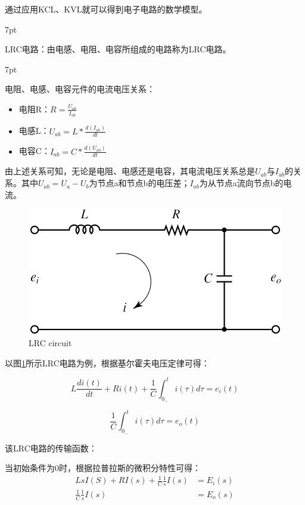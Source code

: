 \documentclass{article}
\numberwithin{equation}{section}
\numberwithin{figure}{section}
\newenvironment{formal}{%
\def\FrameCommand{%
\hspace{1pt}%
{\color{DarkBlue}\vrule width 2pt}%
{\color{formalshade}\vrule width 4pt}%
\colorbox{formalshade}%
}%
\MakeFramed{\advance\hsize-\width\FrameRestore}%
\noindent\hspace{-4.55pt}%
\begin{adjustwidth}{}{7pt}%
\vspace{2pt}\vspace{2pt}%
}
{%
\vspace{2pt}\end{adjustwidth}\endMakeFramed%
}
\begin{document}
通过应用KCL、KVL就可以得到电子电路的数学模型。

\begin{formal}
    LRC电路：由电感、电阻、电容所组成的电路称为LRC电路。
\end{formal}

\begin{formal}
    电阻、电感、电容元件的电流电压关系：
    \begin{itemize}
        \item 电阻R：$R=\frac{U_{ab}}{I_{ab}}$
        \item 电感L：$U_{ab}=L*\frac{d(I_{ab})}{dt}$
        \item 电容C：$I_{ab}=C*\frac{d(U_{ab})}{dt}$
    \end{itemize}
    由上述关系可知，无论是电阻、电感还是电容，其电流电压关系总是$U_{ab}$与$I_{ab}$的关系。其中$U_{ab}=U_{a}-U_{b}$为节点a和节点b的电压差；$I_{ab}$为从节点a流向节点b的电流。
\end{formal}

\begin{figure}
    \centering
    \includegraphics[width=.4\textwidth]{Chapter3/LRCcircuit.png} %
    \caption{LRC circuit} %
    \label{LRCcircuit} %
\end{figure}

以图\ref{LRCcircuit}所示LRC电路为例，根据基尔霍夫电压定律可得：

\begin{equation}
    L\frac{di(t)}{dt}+Ri(t)+\frac{1}{C}\int_{0_-}^{t}{i(\tau)d\tau}=e_i(t)
\end{equation}

\begin{equation}
    \frac{1}{C}\int_{0_-}^{t}{i(\tau)d\tau}=e_o(t)
\end{equation}

该LRC电路的传输函数：

当初始条件为0时，根据拉普拉斯的微积分特性可得：
\begin{equation}
    \begin{split}
        LsI(S)+RI(s)+\frac{1}{C}\frac{1}{s}I(s)&=E_i(s) \\
        \frac{1}{C}\frac{1}{s}I(s)&=E_o(s)
    \end{split}
\end{equation}
\end{document}
